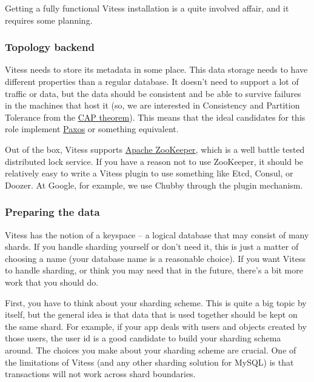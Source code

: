 Getting a fully functional Vitess installation is a quite involved affair, and
it requires some planning.

\subsubsection{Topology backend}\hypertarget{topology-backend}{}\label{topology-backend}

Vitess needs to store its metadata in some place. This data storage needs to
have different properties than a regular database. It doesn’t need to support a
lot of traffic or data, but the data should be consistent and be able to survive
failures in the machines that host it (so, we are interested in Consistency and
Partition Tolerance from the \href{http://en.wikipedia.org/wiki/CAP\_theorem}{CAP
theorem}). This means that the ideal
candidates for this role implement
\href{http://en.wikipedia.org/wiki/Paxos\_(computer\_science)}{Paxos} or something
equivalent.

Out of the box, Vitess supports \href{http://zookeeper.apache.org/}{Apache
ZooKeeper}, which is a well battle tested
distributed lock service. If you have a reason not to use ZooKeeper, it should
be relatively easy to write a Vitess plugin to use something like Etcd, Consul,
or Doozer. At Google, for example, we use Chubby through the plugin mechanism.

\subsubsection{Preparing the data}\hypertarget{preparing-the-data}{}\label{preparing-the-data}

Vitess has the notion of a keyspace – a logical database that may consist of
many shards. If you handle sharding yourself or don’t need it, this is just a
matter of choosing a name (your database name is a reasonable choice). If you
want Vitess to handle sharding, or think you may need that in the future,
there’s a bit more work that you should do.

First, you have to think about your sharding scheme. This is quite a big topic
by itself, but the general idea is that data that is used together should be
kept on the same shard. For example, if your app deals with users and objects
created by those users, the user id is a good candidate to build your sharding
schema around. The choices you make about your sharding scheme are crucial. One
of the limitations of Vitess (and any other sharding solution for MySQL) is that
transactions will not work across shard boundaries.

